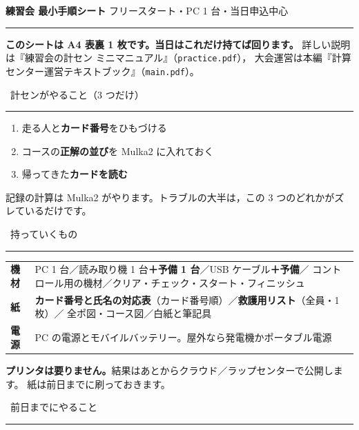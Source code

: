\documentclass[a4paper,9pt]{ltjsarticle}
\newcommand{\hd}[1]{\textbf{\sffamily #1}}
\newcommand{\Head}[1]{%
  \Needspace*{4\baselineskip}%
  \par\vspace{5pt}%
  \noindent\colorbox{boxln}{\color{white}\sffamily\bfseries\strut\ #1\ }\par
  \vspace{1pt}\noindent\textcolor{rulec}{\rule{\textwidth}{0.7pt}}\par\vspace{2pt}%
}
\begin{document}
\gtfamily\sffamily

\begin{center}
{\LARGE\bfseries 練習会 最小手順シート}\quad
{\small フリースタート・PC 1 台・当日申込中心}\\[1mm]
\textcolor{rulec}{\rule{\textwidth}{0.8pt}}
\end{center}

\textbf{このシートは A4 表裏 1 枚です。当日はこれだけ持てば回ります。}
詳しい説明は『練習会の計セン ミニマニュアル』（\texttt{practice.pdf}），
大会運営は本編『計算センター運営テキストブック』（\texttt{main.pdf}）。

\Head{計センがやること（3 つだけ）}

\begin{enumerate}[leftmargin=*,itemsep=0pt]
\item 走る人と\textbf{カード番号}をひもづける
\item コースの\textbf{正解の並び}を Mulka2 に入れておく
\item 帰ってきた\textbf{カードを読む}
\end{enumerate}

記録の計算は Mulka2 がやります。トラブルの大半は，この 3 つのどれかがズレているだけです。

\Head{持っていくもの}

\begin{center}
\small
\begin{tabular}{@{}P{26mm}P{150mm}@{}}
\toprule
\hd{機材} & PC 1 台／読み取り機 1 台\textbf{＋予備 1 台}／USB ケーブル\textbf{＋予備}／
  コントロール用の機材／クリア・チェック・スタート・フィニッシュ \\
\hd{紙} & \textbf{カード番号と氏名の対応表}（カード番号順）／\textbf{救護用リスト}（全員・1 枚）／
  全ポ図・コース図／白紙と筆記具 \\
\hd{電源} & PC の電源とモバイルバッテリー。屋外なら発電機かポータブル電源 \\
\bottomrule
\end{tabular}
\end{center}

\textbf{プリンタは要りません。}結果はあとからクラウド／ラップセンターで公開します。
紙は前日までに刷っておきます。

\Head{前日までにやること}
\end{document}
